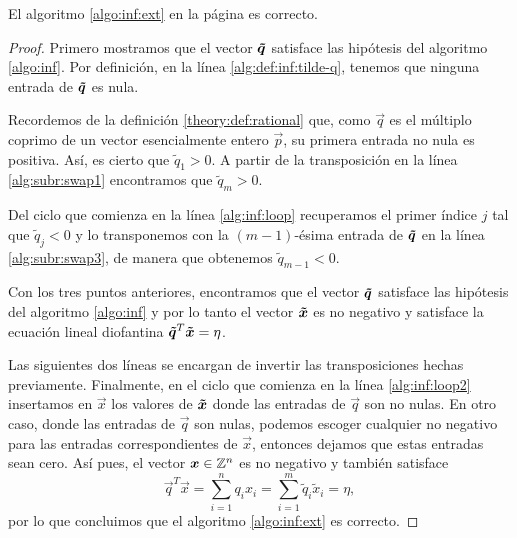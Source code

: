 \begin{theorem}
	\label{th:alg:inf}
	El algoritmo \ref{algo:inf:ext} en la página \pageref{algo:inf:ext} es correcto.
\end{theorem}
\begin{proof}
	Primero mostramos que el vector $\boldsymbol{\tilde{q}}$ satisface las hipótesis del algoritmo
	\ref{algo:inf}. Por definición, en la línea \ref{alg:def:inf:tilde-q}, tenemos que ninguna
	entrada de $\boldsymbol{\tilde{q}}$ es nula.

	Recordemos de la definición \ref{theory:def:rational} que, como $\vec{q}$ es el múltiplo coprimo
	de un vector esencialmente entero $\vec{p}$, su primera entrada no nula es positiva. Así, es
	cierto que $\tilde{q}_1 > 0$. A partir de la transposición en la línea \ref{alg:subr:swap1}
	encontramos que $\tilde{q}_m > 0$.

	Del ciclo que comienza en la línea \ref{alg:inf:loop} recuperamos el primer índice $j$ tal que
	$\tilde{q}_j < 0$ y lo transponemos con la $(m - 1)$-ésima entrada de $\boldsymbol{\tilde{q}}$ en la línea
	\ref{alg:subr:swap3}, de manera que obtenemos $\tilde{q}_{m-1} < 0$.

	Con los tres puntos anteriores, encontramos que el vector $\boldsymbol{\tilde{q}}$ satisface las
	hipótesis del algoritmo \ref{algo:inf} y por lo tanto el vector $\boldsymbol{\tilde{x}}$ es no negativo
	y satisface la ecuación lineal diofantina $\boldsymbol{\tilde{q}}^T\boldsymbol{\tilde{x}} = \eta$.

	Las siguientes dos líneas se encargan de invertir las transposiciones hechas previamente.
	Finalmente, en el ciclo que comienza en la línea \ref{alg:inf:loop2} insertamos en $\vec{x}$ los
	valores de $\boldsymbol{\tilde{x}}$ donde las entradas de $\vec{q}$ son no nulas. En otro caso, donde las
	entradas de $\vec{q}$ son nulas, podemos escoger cualquier no negativo para las entradas
	correspondientes de $\vec{x}$, entonces dejamos que estas entradas sean
	cero. Así pues, el vector $\boldsymbol{x} \in \mathbb{Z}^n$ es no negativo y también satisface
	\begin{equation*}
		\vec{q}^T\vec{x} = \sum_{i = 1}^{n}q_ix_i
		= \sum_{i = 1}^{m}\tilde{q}_i\tilde{x}_i
		= \eta,
	\end{equation*}
	por lo que concluimos que el algoritmo \ref{algo:inf:ext} es correcto.
\end{proof}

